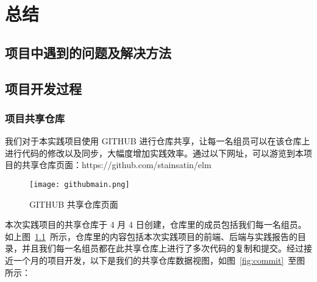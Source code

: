 \chapter{总结}

\section{项目中遇到的问题及解决方法}


\section{项目开发过程}
\subsection{项目共享仓库}
我们对于本实践项目使用 GITHUB 进行仓库共享，让每一名组员可以在该仓库上进行代码的修改以及同步，大幅度增加实践效率。通过以下网址，可以游览到本项目的共享仓库页面：https://github.com/stainsatin/elm
\begin{figure}[htbp]
    \centering
    \texttt{[image: githubmain.png]}
    \caption{GITHUB 共享仓库页面}\label{fig:githubmain}
    \vspace{\baselineskip}
\end{figure}

本次实践项目的共享仓库于 4 月 4 日创建，仓库里的成员包括我们每一名组员。如上图~\ref{fig:githubmain}~所示，仓库里的内容包括本次实践项目的前端、后端与实践报告的目录，并且我们每一名组员都在此共享仓库上进行了多次代码的复制和提交。经过接近一个月的项目开发，以下是我们的共享仓库数据视图，如图~\ref{fig:commit}~至图所示：

